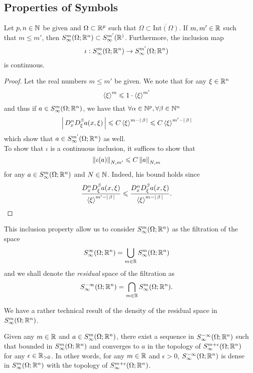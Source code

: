 \documentclass{article}
\begin{document}
\subsection{Properties of Symbols}

\begin{fprop}
    Let $p, n \in \N$ be given and $\Omega \subset \R^p$ such that $\Omega \subset \overline{\mathrm{Int}(\Omega)}$. If $m, m' \in \R$ such that $m \leq m'$, then $S^m_\infty(\Omega; \R^n) \subset S^{m'}_\infty(\R^)$. Furthermore, the inclusion map 
    \begin{align*}
    \iota: S^m_\infty(\Omega; \R^n) \to S^{m'}_\infty(\Omega; \R^n)
    \end{align*}
    is continuous. 
\end{fprop}
\begin{proof}
    Let the real numbers $m \leq m'$ be given. We note that for any $\xi \in \R^n$
    \[
     \sym[\xi]^m \leq 1 \cdot \sym[\xi]^{m'}
     \]
    and thus if $a \in S^{m}_\infty(\Omega; \R^n)$, we have that $\forall \alpha \in \N^p, \forall \beta \in \N^n$
    \[
    \abs{D^\alpha_x D^\beta_\xi a(x, \xi)} \leq C \sym[\xi]^{m - \abs{\beta}} \leq C \sym[\xi]^{m' - \abs{\beta}} 
    \]
    which show that $a \in S^{m'}_\infty(\Omega; \R^n)$ as well. \\
    
    To show that $\iota$ is a continuous inclusion, it suffices to show that 
    \[
    \norm[\iota(a)]_{N, m'} \leq C \norm[a]_{N, m}
    \]
    for any $a \in S^{m}_\infty(\Omega; \R^n)$ and $N \in \N$. Indeed, his bound holds since 
    \[
    \frac{D^\alpha_x D^\beta_\xi a(x, \xi)}{\sym[\xi]^{m' - \abs{\beta}}}  \leq \frac{D^\alpha_x D^\beta_\xi a(x, \xi)}{\sym[\xi]^{m - \abs{\beta}}}. 
    \]
\end{proof}

This inclusion property allow us to consider $S^{m}_\infty(\Omega; \R^n)$ as the filtration of the space 
\[
S^\infty_\infty(\Omega; \R^n) = \bigcup_{m \in \R} S^{m}_\infty(\Omega; \R^n)
\]
and we shall denote the \emph{residual} space of the filtration as 
\[
S^{-\infty}_\infty(\Omega; \R^n) = \bigcap_{m \in \R} S^{m}_\infty(\Omega; \R^n). 
\]

We have a rather technical result of the density of the residual space in $S^{m}_\infty(\Omega; \R^n)$. 
\begin{flemma}
    Given any $m \in \R$ and $a \in S^{m}_\infty(\Omega; \R^n)$, there exist a sequence in $S^{-\infty}_\infty(\Omega; \R^n)$ such that bounded in $S^{m}_\infty(\Omega; \R^n)$ and converges to $a$ in the topology of $S^{m + \epsilon}_\infty(\Omega; \R^n)$ for any $\epsilon \in \R_{> 0}$. In other words, for any $m \in \R$ and $\epsilon > 0$, $S^{-\infty}_\infty(\Omega; \R^n)$ is dense in $S^{m}_\infty(\Omega; \R^n)$ with the topology of $S^{m + \epsilon}_\infty(\Omega; \R^n)$.
\end{flemma}
\end{document}
